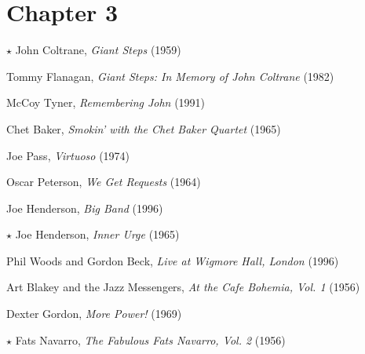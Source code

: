 \section*{Chapter 3}

\vspace{-1em}
\begin{compactitem}
    \item[$\star$] John Coltrane, \emph{Giant Steps} (1959)
    \item Tommy Flanagan, \emph{Giant Steps: In Memory of John Coltrane} (1982)
    \item McCoy Tyner, \emph{Remembering John} (1991)
\end{compactitem}
\nocite{coltrane:giantsteps,flanagan:giantsteps,tyner:remembering}

\begin{compactitem}
    \item Chet Baker, \emph{Smokin' with the Chet Baker Quartet} (1965)
    \item Joe Pass, \emph{Virtuoso} (1974)
    \item Oscar Peterson, \emph{We Get Requests} (1964)
\end{compactitem}
\nocite{baker:smokin,pass:virtuoso,peterson:requests}


\begin{compactitem}
    \item Joe Henderson, \emph{Big Band} (1996)
    \item[$\star$] Joe Henderson, \emph{Inner Urge} (1965)
    \item Phil Woods and Gordon Beck, \emph{Live at Wigmore Hall, London} (1996)
\end{compactitem}
\nocite{henderson:bigband,henderson:isotope,woods:wigmore}

\begin{compactitem}
    \item Art Blakey and the Jazz Messengers, \emph{At the Cafe Bohemia,
        Vol. 1} (1956)
    \item Dexter Gordon, \emph{More Power!} (1969)
    \item[$\star$] Fats Navarro, \emph{The Fabulous Fats Navarro, Vol. 2} (1956)
\end{compactitem}
\nocite{blakey:bohemia,gordon:power,navarro:fabulous}

\clearpage


